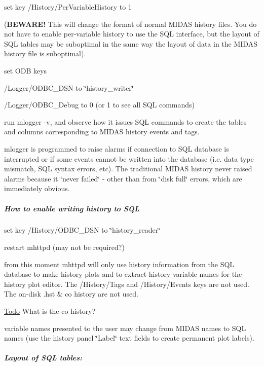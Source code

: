 \begin{DoxyEnumerate}
\item set key /History/PerVariableHistory to 1 \par
({\bfseries BEWARE!} This will change the format of normal MIDAS history files. You do not have to enable per-\/variable history to use the SQL interface, but the layout of SQL tables may be suboptimal in the same way the layout of data in the MIDAS history file is suboptimal). 
\item set ODB keys 
\begin{DoxyItemize}
\item /Logger/ODBC\_\-DSN to \char`\"{}history\_\-writer\char`\"{} 
\item /Logger/ODBC\_\-Debug to 0 (or 1 to see all SQL commands) 
\end{DoxyItemize}
\item run mlogger -\/v, and observe how it issues SQL commands to create the tables and columns corresponding to MIDAS history events and tags. 
\item mlogger is programmed to raise alarms if connection to SQL database is interrupted or if some events cannot be written into the database (i.e. data type mismatch, SQL syntax errors, etc). The traditional MIDAS history never raised alarms because it \char`\"{}never failed\char`\"{} -\/ other than from \char`\"{}disk full\char`\"{} errors, which are immediately obvious. 
\end{DoxyEnumerate}\hypertarget{F_History_logging_F_History_sql_enable}{}\subparagraph{How to enable writing history to SQL}\label{F_History_logging_F_History_sql_enable}

\begin{DoxyEnumerate}
\item set key /History/ODBC\_\-DSN to \char`\"{}history\_\-reader\char`\"{} 
\item restart mhttpd (may not be required?) 
\item from this moment mhttpd will only use history information from the SQL database to make history plots and to extract history variable names for the history plot editor. The /History/Tags and /History/Events keys are not used. The on-\/disk .hst \& co history are not used. \begin{Desc}
\item[\hyperlink{todo__todo000013}{Todo}]What is the co history?\end{Desc}

\item variable names presented to the user may change from MIDAS names to SQL names (use the history panel \char`\"{}Label\char`\"{} text fields to create permanent plot labels). 
\end{DoxyEnumerate}\hypertarget{F_History_logging_F_SQL_Layout}{}\subparagraph{Layout of SQL tables:}\label{F_History_logging_F_SQL_Layout}

